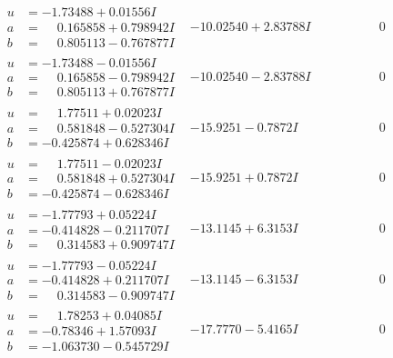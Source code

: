 \documentclass[1p]{elsarticle_modified}
\theoremstyle{definition}
\begin{document}
$$\begin{array}{c|c|c}
\begin{aligned}
u &= -1.73488 + 0.01556 I \\
a &= \phantom{-}0.165858 + 0.798942 I \\
b &= \phantom{-}0.805113 - 0.767877 I\end{aligned}
 & -10.02540 + 2.83788 I & \phantom{-0.000000 } 0 \\ \hline\begin{aligned}
u &= -1.73488 - 0.01556 I \\
a &= \phantom{-}0.165858 - 0.798942 I \\
b &= \phantom{-}0.805113 + 0.767877 I\end{aligned}
 & -10.02540 - 2.83788 I & \phantom{-0.000000 } 0 \\ \hline\begin{aligned}
u &= \phantom{-}1.77511 + 0.02023 I \\
a &= \phantom{-}0.581848 - 0.527304 I \\
b &= -0.425874 + 0.628346 I\end{aligned}
 & -15.9251 - 0.7872 I & \phantom{-0.000000 } 0 \\ \hline\begin{aligned}
u &= \phantom{-}1.77511 - 0.02023 I \\
a &= \phantom{-}0.581848 + 0.527304 I \\
b &= -0.425874 - 0.628346 I\end{aligned}
 & -15.9251 + 0.7872 I & \phantom{-0.000000 } 0 \\ \hline\begin{aligned}
u &= -1.77793 + 0.05224 I \\
a &= -0.414828 - 0.211707 I \\
b &= \phantom{-}0.314583 + 0.909747 I\end{aligned}
 & -13.1145 + 6.3153 I & \phantom{-0.000000 } 0 \\ \hline\begin{aligned}
u &= -1.77793 - 0.05224 I \\
a &= -0.414828 + 0.211707 I \\
b &= \phantom{-}0.314583 - 0.909747 I\end{aligned}
 & -13.1145 - 6.3153 I & \phantom{-0.000000 } 0 \\ \hline\begin{aligned}
u &= \phantom{-}1.78253 + 0.04085 I \\
a &= -0.78346 + 1.57093 I \\
b &= -1.063730 - 0.545729 I\end{aligned}
 & -17.7770 - 5.4165 I & \phantom{-0.000000 } 0 \\ \hline\begin{aligned}

\end{aligned}
\end{array}$$
\end{document}
